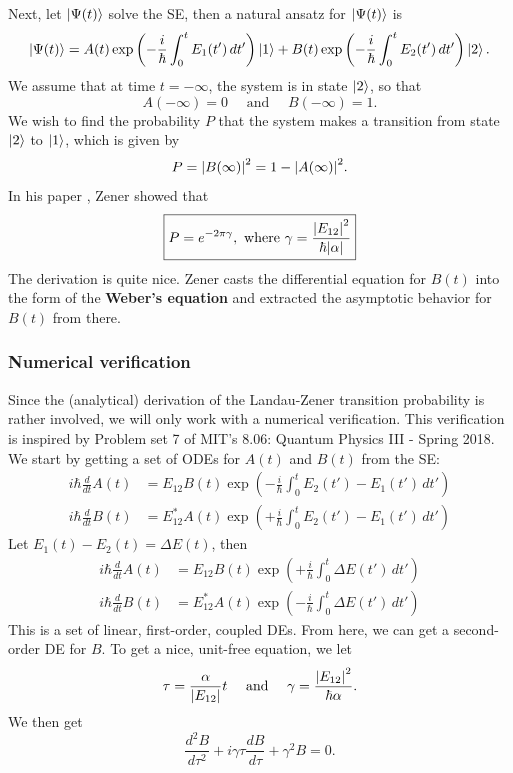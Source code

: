\documentclass{book}
\theoremstyle{definition}
\newcommand{\al}{\alpha}
\newcommand{\f}[2]{\frac{#1}{#2}}
\newcommand{\lp}{\left(}
\newcommand{\rp}{\right)}
\begin{document}
Next, let $\ket{\Psi(t)}$ solve the SE, then a natural ansatz for $\ket{\Psi(t)}$ is 
\begin{equation*}
\ket{\Psi(t)} = A(t) \exp \lp -\f{i}{\hbar}\int_0^{t} E_1(t')\,dt' \rp \ket{1} + B(t) \exp \lp -\f{i}{\hbar}\int_0^{t} E_2(t')\,dt' \rp \ket{2}.
\end{equation*}
We assume that at time $t=-\infty$, the system is in state $\ket{2}$, so that
\begin{equation*}
A(-\infty) = 0 \quad \text{ and } \quad B(-\infty) = 1.
\end{equation*}
We wish to find the probability $P$ that the system makes a transition from state $\ket{2}$ to $\ket{1}$, which is given by 
\begin{equation*}
P = \abs{B(\infty)}^2 = 1- \abs{A(\infty)}^2.
\end{equation*}
In his paper \cite{zener1932non}, Zener showed that 
\begin{equation*}
\boxed{P = e^{-2\pi \gamma}, \text{ where } \gamma = \f{\abs{E_{12}}^2}{\hbar \abs{\al}}} 
\end{equation*}
The derivation is quite nice. Zener casts the differential equation for $B(t)$ into the form of the \textbf{Weber's equation} and extracted the asymptotic behavior for $B(t)$ from there. 


\subsubsection*{Numerical verification}



Since the (analytical) derivation of the Landau-Zener transition probability is rather involved, we will only work with a numerical verification. This verification is inspired by Problem set 7 of MIT's 8.06: Quantum Physics III - Spring 2018. \\


We start by getting a set of ODEs for $A(t)$ and $B(t)$ from the SE:
\begin{align*}
i\hbar  \f{d}{dt}A(t) &= E_{12} B(t)  \exp\lp -\f{i}{\hbar} \int_0^t E_2(t') - E_1(t') \,dt'\rp\\
i\hbar  \f{d}{dt}B(t) &= E_{12}^* A(t)  \exp\lp +\f{i}{\hbar} \int_0^t E_2(t') - E_1(t') \,dt'\rp
\end{align*}
Let $E_1(t) - E_2(t) = \Delta E(t)$, then 
\begin{align*}
i\hbar  \f{d}{dt}A(t) &= E_{12} B(t)  \exp\lp +\f{i}{\hbar} \int_0^t \Delta E(t') \,dt'\rp\\
i\hbar  \f{d}{dt}B(t) &= E_{12}^* A(t)  \exp\lp -\f{i}{\hbar} \int_0^t \Delta E(t') \,dt'\rp
\end{align*}
This is a set of linear, first-order, coupled DEs. From here, we can get a second-order DE for $B$. To get a nice, unit-free equation, we let
\begin{equation*}
\tau = \f{\al}{\abs{E_{12}}} t \quad \text{ and } \quad \gamma = \f{\abs{E_{12}}^2}{\hbar \al}.
\end{equation*}
We then get
\begin{equation*}
\f{d^2 B}{d\tau^2} + i\gamma \tau \f{dB}{d\tau} + \gamma^2 B = 0.
\end{equation*}
\end{document}
